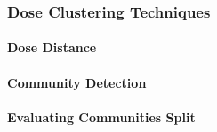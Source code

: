 \subsubsection{Dose Clustering Techniques}
\paragraph{Dose Distance}

\paragraph{Community Detection}
\label{clustering_evaluation}

\paragraph{Evaluating Communities Split}
%
%


